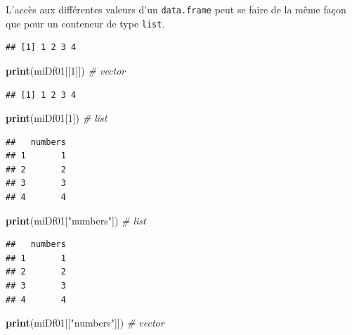 \documentclass[]{book}
\newenvironment{Shaded}{\begin{snugshade}}{\end{snugshade}}
\newcommand{\KeywordTok}[1]{\textcolor[rgb]{0.13,0.29,0.53}{\textbf{#1}}}
\newcommand{\DecValTok}[1]{\textcolor[rgb]{0.00,0.00,0.81}{#1}}
\newcommand{\StringTok}[1]{\textcolor[rgb]{0.31,0.60,0.02}{#1}}
\newcommand{\CommentTok}[1]{\textcolor[rgb]{0.56,0.35,0.01}{\textit{#1}}}
\newcommand{\OperatorTok}[1]{\textcolor[rgb]{0.81,0.36,0.00}{\textbf{#1}}}
\newcommand{\NormalTok}[1]{#1}
\begin{document}
L'accès aux différentes valeurs d'un \texttt{data.frame} peut se faire
de la même façon que pour un conteneur de type \texttt{list}.

\begin{Shaded}
\end{Shaded}

\begin{verbatim}
## [1] 1 2 3 4
\end{verbatim}

\begin{Shaded}
\begin{Highlighting}[]
\KeywordTok{print}\NormalTok{(miDf01[[}\DecValTok{1}\NormalTok{]]) }\CommentTok{# vector}
\end{Highlighting}
\end{Shaded}

\begin{verbatim}
## [1] 1 2 3 4
\end{verbatim}

\begin{Shaded}
\begin{Highlighting}[]
\KeywordTok{print}\NormalTok{(miDf01[}\DecValTok{1}\NormalTok{]) }\CommentTok{# list}
\end{Highlighting}
\end{Shaded}

\begin{verbatim}
##   numbers
## 1       1
## 2       2
## 3       3
## 4       4
\end{verbatim}

\begin{Shaded}
\begin{Highlighting}[]
\KeywordTok{print}\NormalTok{(miDf01[}\StringTok{"numbers"}\NormalTok{]) }\CommentTok{# list}
\end{Highlighting}
\end{Shaded}

\begin{verbatim}
##   numbers
## 1       1
## 2       2
## 3       3
## 4       4
\end{verbatim}

\begin{Shaded}
\begin{Highlighting}[]
\KeywordTok{print}\NormalTok{(miDf01[[}\StringTok{"numbers"}\NormalTok{]]) }\CommentTok{# vector}
\end{Highlighting}
\end{Shaded}
\end{document}
